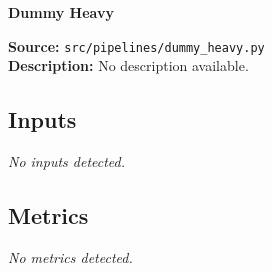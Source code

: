 \documentclass[11pt]{article}
\begin{document}
\begin{center}
\LARGE\textbf{Dummy Heavy}
\end{center}
\textbf{Source:} \texttt{src/\allowbreak{}pipelines/\allowbreak{}dummy\_\allowbreak{}heavy.py}\\
\textbf{Description:} No description available.

\subsection*{Inputs}
\emph{No inputs detected.}

\subsection*{Metrics}
\emph{No metrics detected.}
\end{document}
